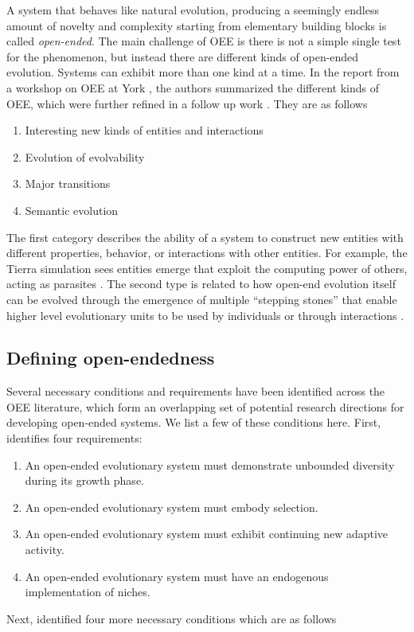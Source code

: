 A system that behaves like natural evolution, producing a seemingly endless
amount of novelty and complexity starting from elementary building blocks is
called \emph{open-ended}. The main challenge of \ac{OEE} is there is not a simple
single test for the phenomenon, but instead there are different kinds of
open-ended evolution. Systems can exhibit more than one kind at a time. In the
report from a workshop on \ac{OEE} at York
\parencite{taylorOpenEndedEvolutionPerspectives2016}, the authors summarized the
different kinds of \ac{OEE}, which were further refined in a follow up work
\parencite{packardOverviewOpenEndedEvolution2019}. They are as follows

\begin{enumerate}
  \item Interesting new kinds of entities and interactions
  \item Evolution of evolvability
  \item Major transitions
  \item Semantic evolution
\end{enumerate}

The first category describes the ability of a system to construct new entities
with different properties, behavior, or interactions with other entities. For
example, the Tierra simulation sees entities emerge that exploit the computing
power of others, acting as parasites \parencite{srayApproachSynthesisLife1991}.
The second type is related to how open-end evolution itself can be evolved
through the emergence of multiple ``stepping stones'' that enable higher level
evolutionary units to be used by individuals or through interactions
\parencite{patteeEvolvedOpenEndednessNot2019}.

\subsection{Defining open-endedness}

Several necessary conditions and requirements have been identified across the
\ac{OEE} literature, which form an overlapping set of potential research
directions for developing open-ended systems. We list a few of these conditions
here. First, \cite{maleyFourStepsOpenended1999} identifies four requirements:

\begin{enumerate}
  \item An open-ended evolutionary system must demonstrate unbounded diversity
        during its growth phase.
  \item An open-ended evolutionary system must embody selection.
  \item An open-ended evolutionary system must exhibit continuing new adaptive
        activity.
  \item An open-ended evolutionary system must have an endogenous implementation
        of niches.
\end{enumerate}
Next, \cite{sorosIdentifyingNecessaryConditions2014} identified four more necessary
conditions which are as follows

